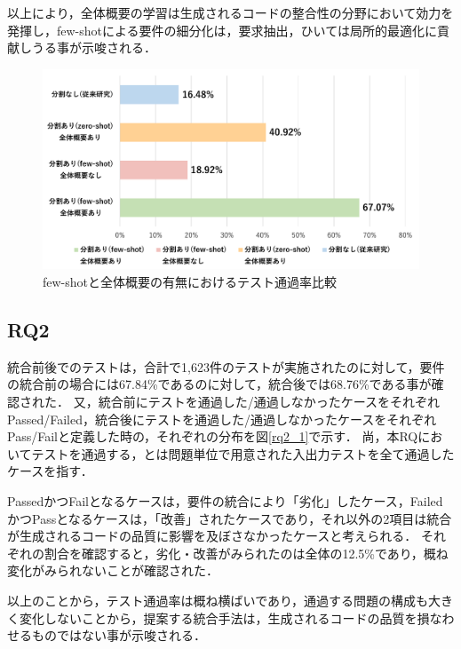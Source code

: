 \documentclass[submit,techrep,noauthor]{ipsj}
\begin{document}
以上により，全体概要の学習は生成されるコードの整合性の分野において効力を発揮し，few-shotによる要件の細分化は，要求抽出，ひいては局所的最適化に貢献しうる事が示唆される．


\begin{figure}[t]
    \centering
    \includegraphics[width=1.0\linewidth]{./Toyoshima_fig/SIGSE_fig1.pdf}
    \caption{few-shotと全体概要の有無におけるテスト通過率比較}
    \label{ses2025}
\end{figure}

\subsection{RQ2}
統合前後でのテストは，合計で1,623件のテストが実施されたのに対して，要件の統合前の場合には67.84\%であるのに対して，統合後では68.76\%である事が確認された．
又，統合前にテストを通過した/通過しなかったケースをそれぞれPassed/Failed，統合後にテストを通過した/通過しなかったケースをそれぞれPass/Failと定義した時の，それぞれの分布を図\ref{rq2_1}で示す．
尚，本RQにおいてテストを通過する，とは問題単位で用意された入出力テストを全て通過したケースを指す．

PassedかつFailとなるケースは，要件の統合により「劣化」したケース，FailedかつPassとなるケースは，「改善」されたケースであり，それ以外の2項目は統合が生成されるコードの品質に影響を及ぼさなかったケースと考えられる．
それぞれの割合を確認すると，劣化・改善がみられたのは全体の12.5\%であり，概ね変化がみられないことが確認された．

以上のことから，テスト通過率は概ね横ばいであり，通過する問題の構成も大きく変化しないことから，提案する統合手法は，生成されるコードの品質を損なわせるものではない事が示唆される．
\end{document}
